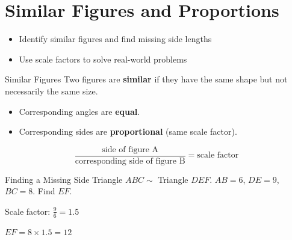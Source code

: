 \section{Similar Figures and Proportions}

\begin{learningGoals}
\begin{itemize}
    \item Identify similar figures and find missing side lengths
    \item Use scale factors to solve real-world problems
\end{itemize}
\end{learningGoals}

\begin{conceptBox}{Similar Figures}
Two figures are \textbf{similar} if they have the same shape but not necessarily the same size.
\begin{itemize}[leftmargin=*]
    \item Corresponding angles are \textbf{equal}.
    \item Corresponding sides are \textbf{proportional} (same scale factor).
\end{itemize}
$$\frac{\text{side of figure A}}{\text{corresponding side of figure B}} = \text{scale factor}$$
\end{conceptBox}

\begin{workedExample}{Finding a Missing Side}
Triangle $ABC \sim$ Triangle $DEF$. $AB = 6$, $DE = 9$, $BC = 8$. Find $EF$.

Scale factor: $\frac{9}{6} = 1.5$

$EF = 8 \times 1.5 = 12$
\end{workedExample}


